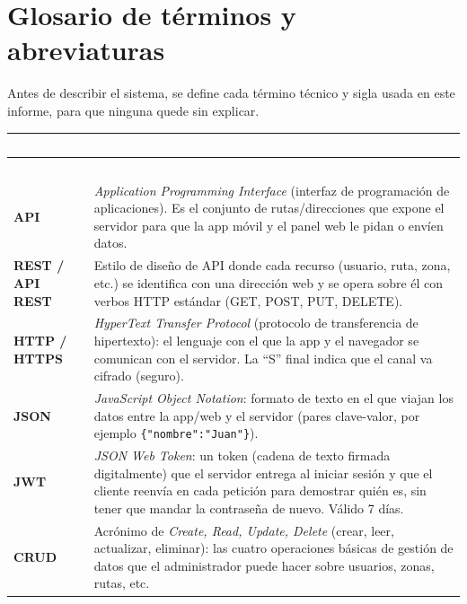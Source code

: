 \documentclass[11pt,a4paper]{article}
\begin{document}
\newpage

\tableofcontents
\newpage

\section{Glosario de términos y abreviaturas}
Antes de describir el sistema, se define cada término técnico y sigla usada en este informe, para que ninguna quede sin explicar.

\begin{longtable}{|p{3.2cm}|p{11cm}|}
\hline
\rowcolor{azuloscuro}
\textcolor{white}{\textbf{Término}} & \textcolor{white}{\textbf{Significado}} \\
\hline
\endfirsthead
\hline
\rowcolor{azuloscuro}
\textcolor{white}{\textbf{Término}} & \textcolor{white}{\textbf{Significado}} \\
\hline
\endhead
\textbf{API} & \textit{Application Programming Interface} (interfaz de programación de aplicaciones). Es el conjunto de rutas/direcciones que expone el servidor para que la app móvil y el panel web le pidan o envíen datos. \\
\hline
\textbf{REST / API REST} & Estilo de diseño de API donde cada recurso (usuario, ruta, zona, etc.) se identifica con una dirección web y se opera sobre él con verbos HTTP estándar (GET, POST, PUT, DELETE). \\
\hline
\textbf{HTTP / HTTPS} & \textit{HyperText Transfer Protocol} (protocolo de transferencia de hipertexto): el lenguaje con el que la app y el navegador se comunican con el servidor. La ``S'' final indica que el canal va cifrado (seguro). \\
\hline
\textbf{JSON} & \textit{JavaScript Object Notation}: formato de texto en el que viajan los datos entre la app/web y el servidor (pares clave-valor, por ejemplo \texttt{\{"nombre":"Juan"\}}). \\
\hline
\textbf{JWT} & \textit{JSON Web Token}: un token (cadena de texto firmada digitalmente) que el servidor entrega al iniciar sesión y que el cliente reenvía en cada petición para demostrar quién es, sin tener que mandar la contraseña de nuevo. Válido 7 días. \\
\hline
\textbf{CRUD} & Acrónimo de \textit{Create, Read, Update, Delete} (crear, leer, actualizar, eliminar): las cuatro operaciones básicas de gestión de datos que el administrador puede hacer sobre usuarios, zonas, rutas, etc. \\

\end{longtable}
\end{document}
